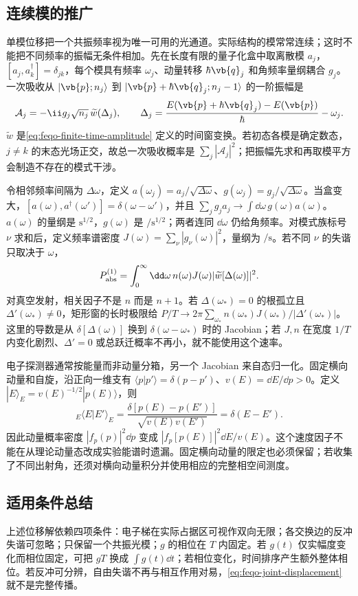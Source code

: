 \subsection{连续模的推广}

单模位移把一个共振频率视为唯一可用的光通道。实际结构的模常常连续；这时不能把不同频率的振幅无条件相加。先在长度有限的量子化盒中取离散模 \(a_j\)，\([a_j,a_k^\dagger]=\delta_{jk}\)，每个模具有频率 \(\omega_j\)、动量转移 \(\hbar\vb{q}_j\) 和角频率量纲耦合 \(g_j\)。一次吸收从 \(|\vb{p};n_j\rangle\) 到 \(|\vb{p}+\hbar\vb{q}_j;n_j-1\rangle\) 的一阶振幅是
\begin{equation}
\mathcal A_j=-\ii g_j\sqrt{n_j}\,
\widetilde w(\Delta_j),\qquad
\Delta_j=\frac{E(\vb{p}+\hbar\vb{q}_j)-E(\vb{p})}{\hbar}-\omega_j .
\label{eq:feqo-continuum-mode-amplitude}
\end{equation}
\(\widetilde w\) 是\cref{eq:feqo-finite-time-amplitude} 定义的时间窗变换。若初态各模是确定数态，\(j\neq k\) 的末态光场正交，故总一次吸收概率是 \(\sum_j|\mathcal A_j|^2\)；把振幅先求和再取模平方会制造不存在的模式干涉。

令相邻频率间隔为 \(\Delta\omega\)，定义 \(a(\omega_j)=a_j/\sqrt{\Delta\omega}\)、\(g(\omega_j)=g_j/\sqrt{\Delta\omega}\)。当盒变大，\([a(\omega),a^\dagger(\omega')]=\delta(\omega-\omega')\)，并且 \(\sum_jg_ja_j\to\int\dd\omega\,g(\omega)a(\omega)\)。\(a(\omega)\) 的量纲是 \(\si{\second\tothe{1/2}}\)，\(g(\omega)\) 是 \(\si{\per\second\tothe{1/2}}\)；两者连同 \(\dd\omega\) 仍给角频率。对模式族标号 \(\nu\) 求和后，定义频率谱密度 \(J(\omega)=\sum_\nu|g_\nu(\omega)|^2\)，量纲为 \(\si{\per\second}\)。若不同 \(\nu\) 的失谐只取决于 \(\omega\)，
\begin{equation}
P_{\rm abs}^{(1)}=\int_0^\infty\dd\omega\,
n(\omega)J(\omega)|\widetilde w[\Delta(\omega)]|^2.
\label{eq:feqo-continuum-absorption}
\end{equation}
对真空发射，相关因子不是 \(n\) 而是 \(n+1\)。若 \(\Delta(\omega_*)=0\) 的根孤立且 \(\Delta'(\omega_*)\neq0\)，矩形窗的长时极限给 \(P/T\to2\pi\sum_{\omega_*}n(\omega_*)J(\omega_*)/|\Delta'(\omega_*)|\)。这里的导数是从 \(\delta[\Delta(\omega)]\) 换到 \(\delta(\omega-\omega_*)\) 时的 Jacobian；若 \(J,n\) 在宽度 \(1/T\) 内变化剧烈、\(\Delta'=0\) 或总跃迁概率不再小，就不能使用这个速率。

电子探测器通常按能量而非动量分箱，另一个 Jacobian 来自态归一化。固定横向动量和自旋，沿正向一维支有 \(\langle p|p'\rangle=\delta(p-p')\)、\(v(E)=\dd E/\dd p>0\)。定义 \(|E\rangle_E=v(E)^{-1/2}|p(E)\rangle\)，则
\[
{}_E\langle E|E'\rangle_E=
\frac{\delta[p(E)-p(E')]}{\sqrt{v(E)v(E')}}
=\delta(E-E').
\]
因此动量概率密度 \(|f_p(p)|^2\dd p\) 变成 \(|f_p[p(E)]|^2\dd E/v(E)\)。这个速度因子不能在从理论动量态改成实验能谱时遗漏。固定横向动量的限定也必须保留；若收集了不同出射角，还须对横向动量积分并使用相应的完整相空间测度。

\subsection{适用条件总结}

上述位移解依赖四项条件：电子梯在实际占据区可视作双向无限；各交换边的反冲失谐可忽略；只保留一个共振光模；\(g\) 的相位在 \(T\) 内固定。若 \(g(t)\) 仅实幅度变化而相位固定，可把 \(gT\) 换成 \(\int g(t)\dd t\)；若相位变化，时间排序产生额外整体相位。若反冲可分辨，自由失谐不再与相互作用对易，\cref{eq:feqo-joint-displacement} 就不是完整传播。





